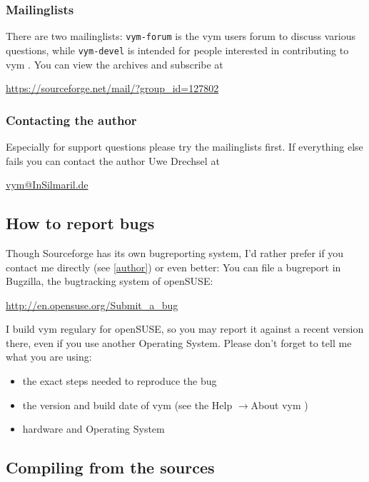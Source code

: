 \documentclass[12pt,a4paper]{article}
\newcommand{\vym}{{\sc vym }}
\newcommand{\ra}{$\longrightarrow$}
\begin{document}
\begin{appendix}
\subsubsection*{Mailinglists}
There are two mailinglists: {\tt vym-forum} is the \vym users forum to
discuss various questions, while {\tt vym-devel} is intended for people
interested in contributing to \vym. You can view the archives and
subscribe at
\begin{center}
\href{https://sourceforge.net/mail/?group_id=127802}{https://sourceforge.net/mail/?group\_id=127802}
\end{center}

\subsubsection*{Contacting the author}\label{author}
Especially for support questions please try the mailinglists first. If
everything else fails you can contact the author Uwe Drechsel at
\begin{center}
\href{mailto:vym@InSilmaril.de}{vym@InSilmaril.de}
\end{center}



\subsection{How to report bugs}
Though Sourceforge has its own bugreporting system, I'd rather prefer if
you contact me directly (see \ref{author}) or even better: You can file
a bugreport in Bugzilla, the bugtracking system of openSUSE:
\begin{center}
\href{http://en.opensuse.org/Submit_a_bug}{http://en.opensuse.org/Submit\_a\_bug}
\end{center}
I build \vym regulary for openSUSE, so you may report it against a
recent version there, even if you  use another Operating System.
Please don't forget to tell me what you are using:
\begin{itemize}
	\item the exact steps needed to reproduce the bug
	\item the version and build date of \vym (see the Help \ra About
	\vym)
	\item hardware and Operating System
\end{itemize}

\subsection{Compiling from the sources}

\end{appendix}
\end{document}
